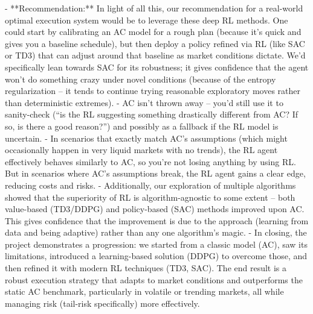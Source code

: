 \documentclass[11pt]{article}
\begin{document}
		- **Recommendation:** In light of all this, our recommendation for a real-world optimal execution system would be to leverage these deep RL methods. One could start by calibrating an AC model for a rough plan (because it’s quick and gives you a baseline schedule), but then deploy a policy refined via RL (like SAC or TD3) that can adjust around that baseline as market conditions dictate. We’d specifically lean towards SAC for its robustness; it gives confidence that the agent won’t do something crazy under novel conditions (because of the entropy regularization – it tends to continue trying reasonable exploratory moves rather than deterministic extremes).
		- AC isn’t thrown away – you’d still use it to sanity-check (“is the RL suggesting something drastically different from AC? If so, is there a good reason?”) and possibly as a fallback if the RL model is uncertain.
		- In scenarios that exactly match AC’s assumptions (which might occasionally happen in very liquid markets with no trends), the RL agent effectively behaves similarly to AC, so you’re not losing anything by using RL. But in scenarios where AC’s assumptions break, the RL agent gains a clear edge, reducing costs and risks.
		- Additionally, our exploration of multiple algorithms showed that the superiority of RL is algorithm-agnostic to some extent – both value-based (TD3/DDPG) and policy-based (SAC) methods improved upon AC. This gives confidence that the improvement is due to the approach (learning from data and being adaptive) rather than any one algorithm’s magic.
		- In closing, the project demonstrates a progression: we started from a classic model (AC), saw its limitations, introduced a learning-based solution (DDPG) to overcome those, and then refined it with modern RL techniques (TD3, SAC). The end result is a robust execution strategy that adapts to market conditions and outperforms the static AC benchmark, particularly in volatile or trending markets, all while managing risk (tail-risk specifically) more effectively.
	
\end{document}
